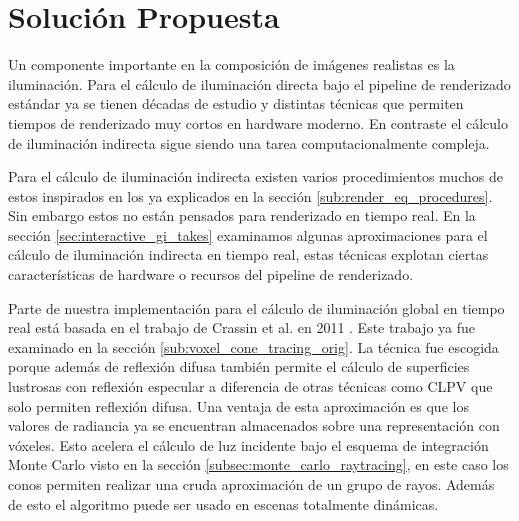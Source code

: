 \chapter{Solución Propuesta}
\label{chap:proposal}

Un componente importante en la composición de imágenes realistas es la iluminación. Para el cálculo de iluminación directa bajo el pipeline de renderizado estándar ya se tienen décadas de estudio y distintas técnicas que permiten tiempos de renderizado muy cortos en hardware moderno. En contraste el cálculo de iluminación indirecta sigue siendo una tarea computacionalmente compleja. 

Para el cálculo de iluminación indirecta existen varios procedimientos muchos de estos inspirados en los ya explicados en la sección \ref{sub:render_eq_procedures}. Sin embargo estos no están pensados para renderizado en tiempo real. En la sección \ref{sec:interactive_gi_takes} examinamos algunas aproximaciones para el cálculo de iluminación indirecta en tiempo real, estas técnicas explotan ciertas características de hardware o recursos del pipeline de renderizado.

Parte de nuestra implementación para el cálculo de iluminación global en tiempo real está basada en el trabajo de Crassin et al. en 2011 \cite{CNSGE11b}. Este trabajo ya fue examinado en la sección \ref{sub:voxel_cone_tracing_orig}. La técnica fue escogida porque además de reflexión difusa también permite el cálculo de superficies lustrosas con reflexión especular a diferencia de otras técnicas como \ac{CLPV} que solo permiten reflexión difusa. Una ventaja de esta aproximación es que los valores de radiancia ya se encuentran almacenados sobre una representación con vóxeles. Esto acelera el cálculo de luz incidente bajo el esquema de integración Monte Carlo visto en la sección \ref{subsec:monte_carlo_raytracing}, en este caso los conos permiten realizar una cruda aproximación de un grupo de rayos. Además de esto el algoritmo puede ser usado en escenas totalmente dinámicas.







